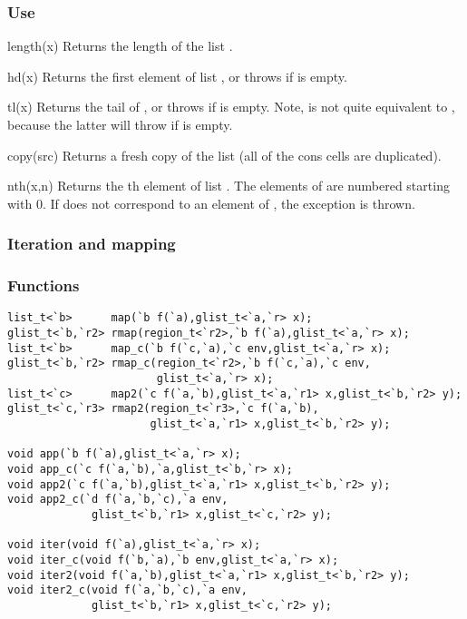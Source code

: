 \subsubsection*{Use}

\begin{defun}{length}{(x)}
Returns the length of the list .
\end{defun}

\begin{defun}{hd}{(x)}
Returns the first element of list , or throws 
if  is empty.
\end{defun}

\begin{defun}{tl}{(x)}
Returns the tail of , or throws  if  is
empty.  Note,  is not quite equivalent to
, because the latter will throw 
if  is empty.
\end{defun}

\begin{defun}{copy}{(src)}
Returns a fresh copy of the list  (all of the cons cells are
duplicated).
\end{defun}

\begin{defun}{nth}{(x,n)}
Returns the th element of list .  The elements of 
are numbered starting with 0.  If  does not correspond to an
element of , the exception  is thrown.
\end{defun}

\subsubsection*{Iteration and mapping}
\subsubsection*{Functions}
\begin{verbatim}
list_t<`b>      map(`b f(`a),glist_t<`a,`r> x);
glist_t<`b,`r2> rmap(region_t<`r2>,`b f(`a),glist_t<`a,`r> x);
list_t<`b>      map_c(`b f(`c,`a),`c env,glist_t<`a,`r> x);
glist_t<`b,`r2> rmap_c(region_t<`r2>,`b f(`c,`a),`c env,
                       glist_t<`a,`r> x);
list_t<`c>      map2(`c f(`a,`b),glist_t<`a,`r1> x,glist_t<`b,`r2> y);
glist_t<`c,`r3> rmap2(region_t<`r3>,`c f(`a,`b),
                      glist_t<`a,`r1> x,glist_t<`b,`r2> y);

void app(`b f(`a),glist_t<`a,`r> x);
void app_c(`c f(`a,`b),`a,glist_t<`b,`r> x);
void app2(`c f(`a,`b),glist_t<`a,`r1> x,glist_t<`b,`r2> y);
void app2_c(`d f(`a,`b,`c),`a env,
             glist_t<`b,`r1> x,glist_t<`c,`r2> y);

void iter(void f(`a),glist_t<`a,`r> x);
void iter_c(void f(`b,`a),`b env,glist_t<`a,`r> x);
void iter2(void f(`a,`b),glist_t<`a,`r1> x,glist_t<`b,`r2> y);
void iter2_c(void f(`a,`b,`c),`a env,
             glist_t<`b,`r1> x,glist_t<`c,`r2> y);
\end{verbatim}

